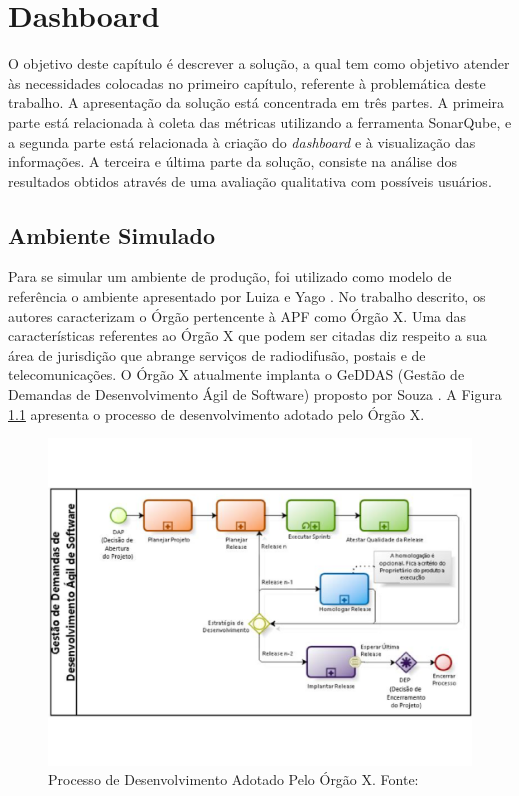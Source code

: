 \chapter[Dashboard]{Dashboard}
O objetivo deste capítulo é descrever a solução, a qual tem como objetivo atender às necessidades colocadas no primeiro capítulo, referente à problemática deste trabalho. A apresentação da solução está concentrada em três partes. A primeira parte está relacionada à coleta das métricas utilizando a ferramenta SonarQube, e a segunda parte está relacionada à criação do \textit{dashboard} e à visualização das informações. A terceira e última parte da solução, consiste na análise dos resultados obtidos através de uma avaliação qualitativa com possíveis usuários.

\section{Ambiente Simulado}
Para se simular um ambiente de produção, foi utilizado como modelo de referência o ambiente apresentado por Luiza e Yago \cite{luiza_yago}. No trabalho descrito, os autores caracterizam o Órgão pertencente à APF como Órgão X. Uma das características referentes ao Órgão X que podem ser citadas diz respeito a sua área de jurisdição que abrange serviços de radiodifusão, postais e de telecomunicações. O Órgão X atualmente implanta o GeDDAS (Gestão de Demandas de Desenvolvimento Ágil de Software) proposto por Souza \cite{souza_sobrinho_uso_2014}. A Figura \ref{img:proc_des} apresenta o processo de desenvolvimento adotado pelo Órgão X.

\graphicspath{{figuras/}}
\begin{figure}[h!]
\centering
\includegraphics[scale=0.60]{Proc_des.pdf}
\caption{Processo de Desenvolvimento Adotado Pelo Órgão X. Fonte: \cite{luiza_yago}}
\label{img:proc_des}
\end{figure}

